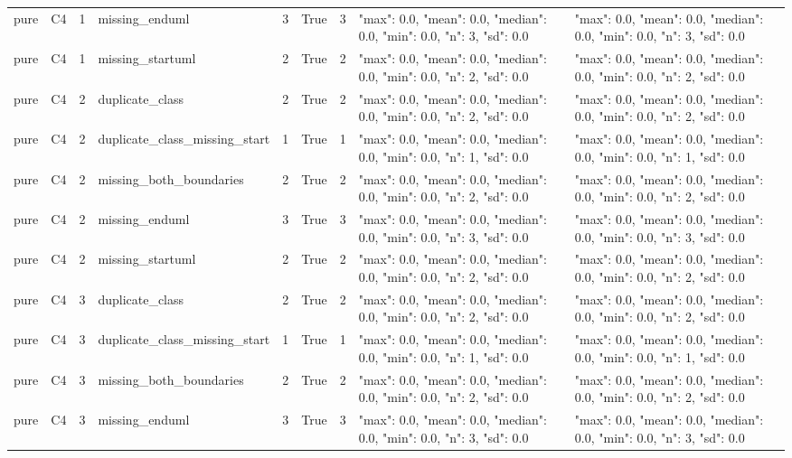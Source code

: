 \begin{tabular}{lllllllll}
pure & C4 & 1 & missing\_enduml & 3 & True & 3 & {"max": 0.0, "mean": 0.0, "median": 0.0, "min": 0.0, "n": 3, "sd": 0.0} & {"max": 0.0, "mean": 0.0, "median": 0.0, "min": 0.0, "n": 3, "sd": 0.0} \\
pure & C4 & 1 & missing\_startuml & 2 & True & 2 & {"max": 0.0, "mean": 0.0, "median": 0.0, "min": 0.0, "n": 2, "sd": 0.0} & {"max": 0.0, "mean": 0.0, "median": 0.0, "min": 0.0, "n": 2, "sd": 0.0} \\
pure & C4 & 2 & duplicate\_class & 2 & True & 2 & {"max": 0.0, "mean": 0.0, "median": 0.0, "min": 0.0, "n": 2, "sd": 0.0} & {"max": 0.0, "mean": 0.0, "median": 0.0, "min": 0.0, "n": 2, "sd": 0.0} \\
pure & C4 & 2 & duplicate\_class\_missing\_start & 1 & True & 1 & {"max": 0.0, "mean": 0.0, "median": 0.0, "min": 0.0, "n": 1, "sd": 0.0} & {"max": 0.0, "mean": 0.0, "median": 0.0, "min": 0.0, "n": 1, "sd": 0.0} \\
pure & C4 & 2 & missing\_both\_boundaries & 2 & True & 2 & {"max": 0.0, "mean": 0.0, "median": 0.0, "min": 0.0, "n": 2, "sd": 0.0} & {"max": 0.0, "mean": 0.0, "median": 0.0, "min": 0.0, "n": 2, "sd": 0.0} \\
pure & C4 & 2 & missing\_enduml & 3 & True & 3 & {"max": 0.0, "mean": 0.0, "median": 0.0, "min": 0.0, "n": 3, "sd": 0.0} & {"max": 0.0, "mean": 0.0, "median": 0.0, "min": 0.0, "n": 3, "sd": 0.0} \\
pure & C4 & 2 & missing\_startuml & 2 & True & 2 & {"max": 0.0, "mean": 0.0, "median": 0.0, "min": 0.0, "n": 2, "sd": 0.0} & {"max": 0.0, "mean": 0.0, "median": 0.0, "min": 0.0, "n": 2, "sd": 0.0} \\
pure & C4 & 3 & duplicate\_class & 2 & True & 2 & {"max": 0.0, "mean": 0.0, "median": 0.0, "min": 0.0, "n": 2, "sd": 0.0} & {"max": 0.0, "mean": 0.0, "median": 0.0, "min": 0.0, "n": 2, "sd": 0.0} \\
pure & C4 & 3 & duplicate\_class\_missing\_start & 1 & True & 1 & {"max": 0.0, "mean": 0.0, "median": 0.0, "min": 0.0, "n": 1, "sd": 0.0} & {"max": 0.0, "mean": 0.0, "median": 0.0, "min": 0.0, "n": 1, "sd": 0.0} \\
pure & C4 & 3 & missing\_both\_boundaries & 2 & True & 2 & {"max": 0.0, "mean": 0.0, "median": 0.0, "min": 0.0, "n": 2, "sd": 0.0} & {"max": 0.0, "mean": 0.0, "median": 0.0, "min": 0.0, "n": 2, "sd": 0.0} \\
pure & C4 & 3 & missing\_enduml & 3 & True & 3 & {"max": 0.0, "mean": 0.0, "median": 0.0, "min": 0.0, "n": 3, "sd": 0.0} & {"max": 0.0, "mean": 0.0, "median": 0.0, "min": 0.0, "n": 3, "sd": 0.0} \\

\end{tabular}
